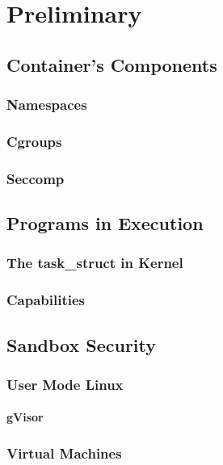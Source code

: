 \chapter{Preliminary}

\section{Container's Components}
\subsection{Namespaces}
\subsection{Cgroups}
\subsection{Seccomp}

\section{Programs in Execution}
\subsection{The task\_struct in Kernel}
\subsection{Capabilities}

\section{Sandbox Security}
\subsection{User Mode Linux}


\subsubsection{gVisor}


\subsection{Virtual Machines}

